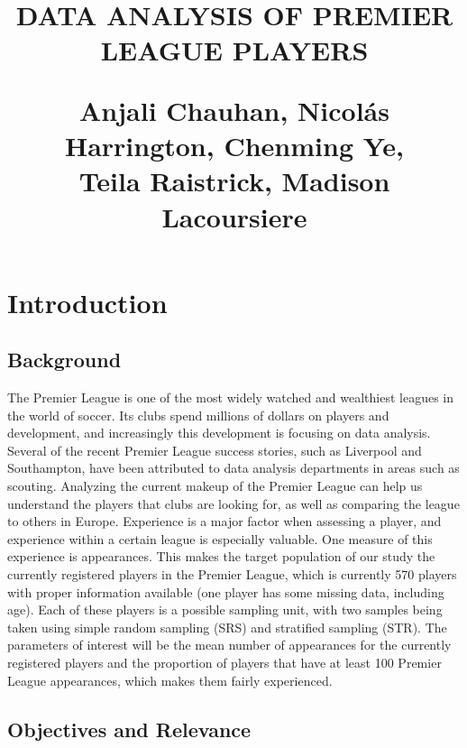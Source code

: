 \documentclass[paper=a4, fontsize=12pt,twoside]{article}	%
\title{	\normalsize \textsc{} 	%
		 	\\[2.0cm]								%
			\HRule{0.5pt} \\						%
			\LARGE \textbf{\uppercase{Data Analysis of Premier League Players}}	%
			\HRule{2pt} \\ [0.5cm]		%
			\normalsize \begin{center}
			    Anjali Chauhan, Nicolás Harrington, Chenming Ye,\\ Teila Raistrick, Madison Lacoursiere
			\end{center}			
		}
\makeatletter
\def\printtitle{%
    {\centering \@title\par}}
\def\printauthor{%
    {\centering \large \@author}}
\makeatother
\begin{document}
\thispagestyle{empty}		%

\printtitle					%
  	\vfill
\printauthor				%
\newpage
\setcounter{page}{1}		%
\section{Introduction}
\subsection{Background}

The Premier League is one of the most widely watched and wealthiest leagues in the world of soccer.  Its clubs spend millions of dollars on players and development, and increasingly this development is focusing on data analysis.  Several of the recent Premier League success stories, such as Liverpool and Southampton, have been attributed to data analysis departments in areas such as scouting.  Analyzing the current makeup of the Premier League can help us understand the players that clubs are looking for, as well as comparing the league to others in Europe.  Experience is a major factor when assessing a player, and experience within a certain league is especially valuable.   One measure of this experience is appearances.  This makes the target population of our study the currently registered players in the Premier League, which is currently 570 players with proper information available (one player has some missing data, including age).  Each of these players is a possible sampling unit, with two samples being taken using simple random sampling (SRS) and stratified sampling (STR).  The parameters of interest will be the mean number of appearances for the currently registered players and the proportion of players that have at least 100 Premier League appearances, which makes them fairly experienced.


\subsection{Objectives and Relevance}
\end{document}
